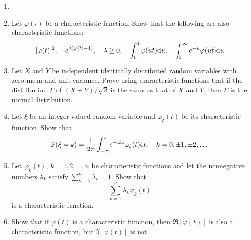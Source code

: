 \begin{exercise}
\begin{enumerate}
    \item[]
    \item Let $\varphi(t)$ be a characteristic function. Show that the following are also characteristic functions:
    \begin{equation*}
        |\varphi(t)|^2, \quad e^{\lambda(\varphi(t) - 1)}, \quad \lambda \ge 0, \quad \int_0^1 \varphi(u t) \mathrm{d} u, \quad  \int_0^\infty e^{-u} \varphi(u t) \mathrm{d} u
    \end{equation*}
    \item Let $X$ and $Y$ be independent identically distributed random variables with zero mean and unit variance. Prove using characteristic functions that if the distribution $F$ of $(X+Y)/\sqrt{2}$ is the same as that of $X$ and $Y$, then $F$ is the normal distribution.
    \item Let $\xi$ be an integer-valued random variable and $\varphi_\xi(t)$ be its characteristic function. Show that
    \begin{equation*}
        \mathbb{P}(\xi = k) = \frac{1}{2\pi} \int_{-\pi}^\pi e^{-ikt} \varphi_\xi(t) \mathrm{d} t, \quad k = 0, \pm 1, \pm 2, \dots
    \end{equation*}
    \item Let $\varphi_k(t)$, $k=1,2,\dots,n$ be characteristic functions and let the nonnegative numbers $\lambda_k$ satisfy $\sum_{k=1}^n \lambda_k = 1$. Show that 
    \begin{equation*}
        \sum_{k=1}^n \lambda_k \varphi_k(t)
    \end{equation*}
    is a characteristic function.
    \item Show that if $\varphi(t)$ is a characteristic function, then $\Re[\varphi(t)]$ is also a characteristic function, but $\Im[\varphi(t)]$ is not.
\end{enumerate}
\end{exercise}
\newpage